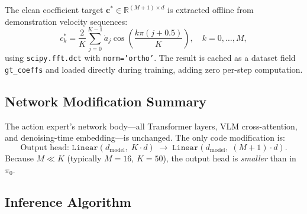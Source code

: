 \documentclass[11pt]{article}
\theoremstyle{plain}
\theoremstyle{definition}
\newcommand{\R}{\mathbb{R}}
\newcommand{\ccoeff}{\mathbf{c}}
\newcommand{\cclean}{\ccoeff^*}
\begin{document}
The clean coefficient target $\cclean \in \R^{(M+1)\times d}$ is
extracted offline from demonstration velocity sequences:
\begin{equation}
  c^*_k = \frac{2}{K}\sum_{j=0}^{K-1} \dot{a}_j
  \cos\!\left(\frac{k\pi(j+0.5)}{K}\right),
  \quad k = 0,\ldots,M,
\end{equation}
using \texttt{scipy.fft.dct} with \texttt{norm='ortho'}.
The result is cached as a dataset field \texttt{gt\_coeffs} and loaded
directly during training, adding zero per-step computation.

\subsection{Network Modification Summary}

The action expert's network body---all Transformer layers, VLM cross-attention,
and denoising-time embedding---is unchanged.
The only code modification is:
\begin{equation}
  \text{Output head: } \texttt{Linear}(d_{\mathrm{model}},\;K \cdot d)
  \;\to\;
  \texttt{Linear}(d_{\mathrm{model}},\;(M{+}1) \cdot d).
\end{equation}
Because $M \ll K$ (typically $M=16$, $K=50$), the output head is
\emph{smaller} than in $\pi_0$.

\subsection{Inference Algorithm}
\end{document}
